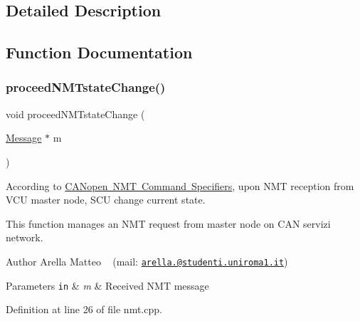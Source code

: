 \subsection{Detailed Description}


\subsection{Function Documentation}
\mbox{\label{group___c_a_nopen___n_m_t__group_ga4f3ea874d17be7eefe09f3d8fcd9fc76}} 
\subsubsection{\texorpdfstring{proceed\+N\+M\+Tstate\+Change()}{proceedNMTstateChange()}}
{\footnotesize\ttfamily void proceed\+N\+M\+Tstate\+Change (\begin{DoxyParamCaption}\item[{\mbox{\hyperlink{struct_message}{Message}} $\ast$}]{m }\end{DoxyParamCaption})}



According to \mbox{\hyperlink{group___c_a_nopen___n_m_t__speficications}{C\+A\+Nopen N\+MT Command Specifiers}}, upon N\+MT reception from V\+CU master node, S\+CU change current state. 

This function manages an N\+MT request from master node on C\+AN servizi network.

\begin{DoxyAuthor}{Author}
Arella Matteo ~\newline
 (mail\+: \href{mailto:arella.1646983@studenti.uniroma1.it}{\tt arella.@studenti.\+uniroma1.\+it})
\end{DoxyAuthor}

\begin{DoxyParams}[1]{Parameters}
\mbox{\tt in}  & {\em m} & Received N\+MT message \\
\hline
\end{DoxyParams}


Definition at line 26 of file nmt.\+cpp.

\mbox{\label{group___c_a_nopen___n_m_t__group_ga26588b389853484f581977032c0e1021}} 
